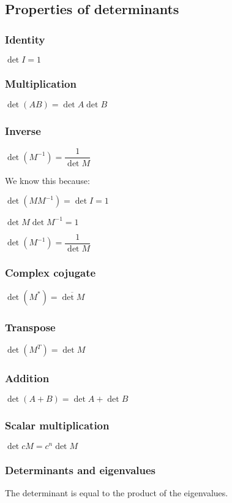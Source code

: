 
\subsection{Properties of determinants}

\subsubsection{Identity}

\(\det I = 1\)

\subsubsection{Multiplication}

\(\det (AB)=\det A \det B\)

\subsubsection{Inverse}

\(\det (M^{-1})=\dfrac{1}{\det M}\)

We know this because:

\(\det (MM^{-1})=\det I = 1\)

\(\det M \det M^{-1}=1\)

\(\det (M^{-1})=\dfrac{1}{\det M}\)

\subsubsection{Complex cojugate}

\(\det (M^*)=\overline {\det M}\)

\subsubsection{Transpose}

\(\det (M^T)=\det M\)

\subsubsection{Addition}

\(\det (A+B)=\det A + \det B\)

\subsubsection{Scalar multiplication}

\(\det cM = c^n\det M\)

\subsubsection{Determinants and eigenvalues}

The determinant is equal to the product of the eigenvalues.

